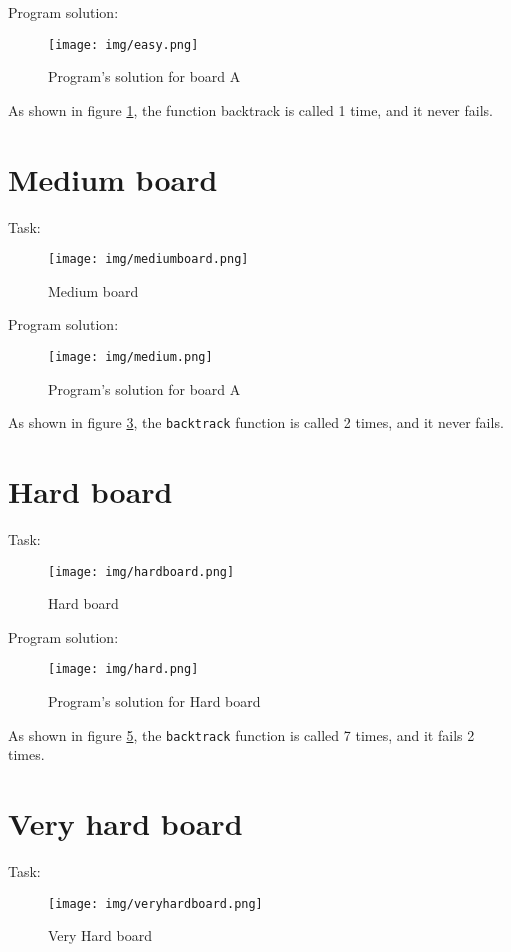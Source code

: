 \documentclass{article}
\begin{document}
Program solution:
\begin{figure}[H]
\centering
\texttt{[image: img/easy.png]}
\caption{\label{fig:easy}Program's solution for board A}
\end{figure}

As shown in figure \ref{fig:easy}, the function backtrack is called 1 time, and it never fails.

\newpage
\section{Medium board}\label{sect3}
Task:
\begin{figure}[H]
\centering
\texttt{[image: img/mediumboard.png]}
\caption{Medium board}
\label{fig:mediumboard}
\end{figure}

Program solution:
\begin{figure}[H]
\centering
\texttt{[image: img/medium.png]}
\caption{\label{fig:medium}Program's solution for board A}
\end{figure}
As shown in figure \ref{fig:medium}, the \texttt{backtrack} function is called 2 times, and it never fails.

\newpage
\section{Hard board}\label{sect4}
Task:
\begin{figure}[H]
\centering
\texttt{[image: img/hardboard.png]}
\caption{Hard board}
\label{fig:hardboard}
\end{figure}

Program solution:
\begin{figure}[H]
\centering
\texttt{[image: img/hard.png]}
\caption{\label{fig:hard}Program's solution for Hard board}
\end{figure}
As shown in figure \ref{fig:hard}, the \texttt{backtrack} function is called 7 times, and it fails 2 times.

\newpage
\section{Very hard board}\label{sect5}
Task:
\begin{figure}[H]
\centering
\texttt{[image: img/veryhardboard.png]}
\caption{Very Hard board}
\label{fig:veryhardboard}
\end{figure}
\end{document}
